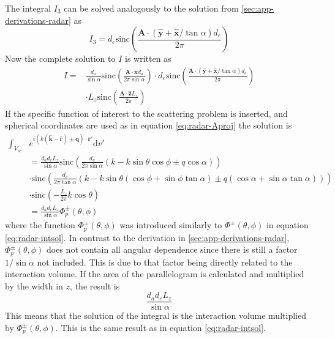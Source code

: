 \documentclass[11pt,twoside]{eitExjobb}
\begin{document}
	The integral $I_3$ can be solved analogously to the solution from \ref{sec:app-derivations-radar} as
	\begin{equation*}
		I_3 = d_e \text{sinc}\left( \frac{\bm{A} \cdot (\bm{\hat{y}} + \bm{\hat{x}}/\tan{\alpha}) d_e}{2\pi} \right)
	\end{equation*}
	Now the complete solution to $I$ is written as
	\begin{equation*}
	\begin{split}
		I =& \frac{d_a}{\sin{\alpha}} \text{sinc}\left( \frac{\bm{A} \cdot \bm{\hat{x}} d_a}{2\pi \sin{\alpha}} \right) \cdot d_e \text{sinc}\left( \frac{\bm{A} \cdot (\bm{\hat{y}} + \bm{\hat{x}}/\tan{\alpha}) d_e}{2\pi} \right) \\
		&\cdot L_z \text{sinc}\left( \frac{\bm{A} \cdot \bm{\hat{z}} L_z}{2\pi} \right)
	\end{split}
	\end{equation*}
	If the specific function of interest to the scattering problem is inserted, and spherical coordinates are used as in equation \eqref{eq:radar-Aproj} the solution is
	\begin{equation*}
	\begin{split}
		\int_{V_{sc}} &e^{i(	k(\bm{\hat{k}} - \bm{\hat{r}}) \pm \bm{q}) \cdot \bm{r}'} \mathrm{d}v' \\
		&= \frac{d_a d_e L_z}{\sin{\alpha}} \text{sinc}\left( \frac{d_a}{2\pi \sin{\alpha}}(k - k\sin{\theta}\cos{\phi} \pm q\cos{\alpha}) \right) \\
		&\cdot \text{sinc}\left( \frac{d_e}{2\pi \tan{\alpha}}
		(k - k\sin{\theta}(\cos{\phi} + \sin{\phi}\tan{\alpha}) \pm q(\cos{\alpha} + \sin{\alpha}\tan{\alpha})) \right) \\
		&\cdot \text{sinc}\left( -\frac{L_z}{2\pi} k\cos{\theta} \right) \\
		&= \frac{d_a d_e L_z}{\sin{\alpha}} \Phi_p^{\pm}(\theta, \phi)
	\end{split}
	\end{equation*}
	where the function $\Phi_p^{\pm}(\theta, \phi)$ was introduced similarly to $\Phi^{\pm}(\theta, \phi)$ in equation \eqref{eq:radar-intsol}. In contrast to the derivation in \ref{sec:app-derivations-radar}, $\Phi_p^{\pm}(\theta, \phi)$ does not contain all angular dependence since there is still a factor $1/\sin{\alpha}$ not included. This is due to that factor being directly related to the interaction volume. If the area of the parallelogram is calculated and multiplied by the width in $z$, the result is
	\begin{equation*}
		\frac{d_a d_e L_z}{\sin{\alpha}}
	\end{equation*}
	This means that the solution of the integral is the interaction volume multiplied by $\Phi_p^{\pm}(\theta, \phi)$. This is the same result as in equation \eqref{eq:radar-intsol}.
	
\end{document}
